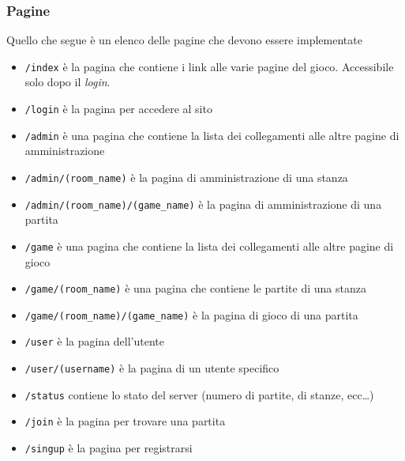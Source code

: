 \documentclass[10pt,a4paper]{article}
\newcommand{\pageurl}[1]{\small\texttt{#1}}
\begin{document}
\subsubsection*{Pagine}
Quello che segue è un elenco delle pagine che devono essere implementate
\begin{itemize}
\item \pageurl{/index} è la pagina che contiene i link alle varie pagine del gioco. Accessibile solo dopo il \emph{login}.
\item \pageurl{/login} è la pagina per accedere al sito
\item \pageurl{/admin} è una pagina che contiene la lista dei collegamenti alle altre pagine di amministrazione 
\item \pageurl{/admin/(room\_name)} è la pagina di amministrazione di una stanza
\item \pageurl{/admin/(room\_name)/(game\_name)} è la pagina di amministrazione di una partita
\item \pageurl{/game} è una pagina che contiene la lista dei collegamenti alle altre pagine di gioco
\item \pageurl{/game/(room\_name)} è una pagina che contiene le partite di una stanza
\item \pageurl{/game/(room\_name)/(game\_name)} è la pagina di gioco di una partita
\item \pageurl{/user} è la pagina dell'utente
\item \pageurl{/user/(username)} è la pagina di un utente specifico
\item \pageurl{/status} contiene lo stato del server (numero di partite, di stanze, ecc\dots)
\item \pageurl{/join} è la pagina per trovare una partita
\item \pageurl{/singup} è la pagina per registrarsi
\end{itemize}

\newpage
\end{document}
